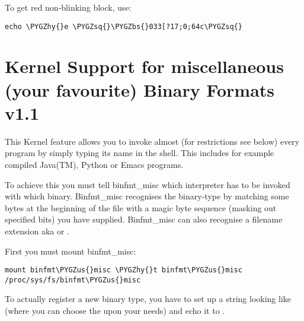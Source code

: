 \documentclass[a4paper,8pt,english]{sphinxmanual}
\def\PYGZbs{\char`\\}
\def\PYGZus{\char`\_}
\def\PYGZhy{\char`\-}
\def\PYGZsq{\char`\'}
\renewcommand\PYGZsq{\textquotesingle}
\begin{document}
To get red non-blinking block, use:

\begin{Verbatim}[commandchars=\\\{\}]
echo \PYGZhy{}e \PYGZsq{}\PYGZbs{}033[?17;0;64c\PYGZsq{}
\end{Verbatim}


\chapter{Kernel Support for miscellaneous (your favourite) Binary Formats v1.1}
\label{admin-guide/binfmt-misc:kernel-support-for-miscellaneous-your-favourite-binary-formats-v1-1}\label{admin-guide/binfmt-misc::doc}
This Kernel feature allows you to invoke almost (for restrictions see below)
every program by simply typing its name in the shell.
This includes for example compiled Java(TM), Python or Emacs programs.

To achieve this you must tell binfmt\_misc which interpreter has to be invoked
with which binary. Binfmt\_misc recognises the binary-type by matching some bytes
at the beginning of the file with a magic byte sequence (masking out specified
bits) you have supplied. Binfmt\_misc can also recognise a filename extension
aka  or .

First you must mount binfmt\_misc:

\begin{Verbatim}[commandchars=\\\{\}]
mount binfmt\PYGZus{}misc \PYGZhy{}t binfmt\PYGZus{}misc /proc/sys/fs/binfmt\PYGZus{}misc
\end{Verbatim}

To actually register a new binary type, you have to set up a string looking like
 (where you can choose the
\code{:} upon your needs) and echo it to .
\end{document}
